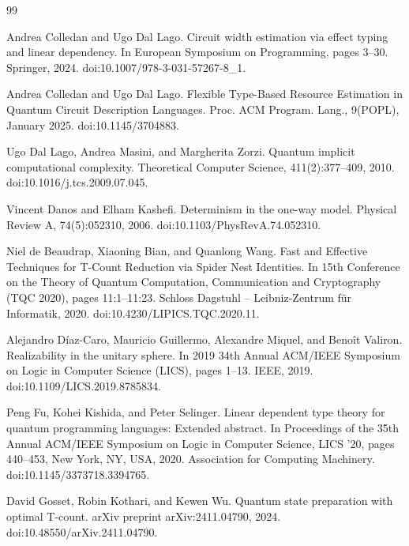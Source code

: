 \documentclass[10pt,a4paper]{amsart}
\begin{document}
\begin{thebibliography}{99}
\par\noindent  [9]  Andrea Colledan and Ugo Dal Lago.  Circuit width estimation via effect typing and linear dependency.  In European Symposium on Programming, pages 3–30. Springer, 2024.  doi:10.1007/978-3-031-57267-8\_1.  
 
\par\noindent  [10]  Andrea Colledan and Ugo Dal Lago.  Flexible Type-Based Resource Estimation in Quantum Circuit Description Languages.  Proc. ACM Program. Lang., 9(POPL), January 2025.  doi:10.1145/3704883.  
 
\par\noindent  [11]  Ugo Dal Lago, Andrea Masini, and Margherita Zorzi.  Quantum implicit computational complexity.  Theoretical Computer Science, 411(2):377–409, 2010.  doi:10.1016/j.tcs.2009.07.045.  
 
\par\noindent  [12]  Vincent Danos and Elham Kashefi.  Determinism in the one-way model.  Physical Review A, 74(5):052310, 2006.  doi:10.1103/PhysRevA.74.052310.  
 
\par\noindent  [13]  Niel de Beaudrap, Xiaoning Bian, and Quanlong Wang.  Fast and Effective Techniques for T-Count Reduction via Spider Nest Identities.  In 15th Conference on the Theory of Quantum Computation, Communication and Cryptography (TQC 2020), pages 11:1–11:23. Schloss Dagstuhl – Leibniz-Zentrum für Informatik, 2020.  doi:10.4230/LIPICS.TQC.2020.11.  
 
\par\noindent  [14]  Alejandro Díaz-Caro, Mauricio Guillermo, Alexandre Miquel, and Benoît Valiron.  Realizability in the unitary sphere.  In 2019 34th Annual ACM/IEEE Symposium on Logic in Computer Science (LICS), pages 1–13. IEEE, 2019.  doi:10.1109/LICS.2019.8785834.  
 
\par\noindent  [15]  Peng Fu, Kohei Kishida, and Peter Selinger.  Linear dependent type theory for quantum programming languages: Extended abstract.  In Proceedings of the 35th Annual ACM/IEEE Symposium on Logic in Computer Science, LICS ’20, pages 440–453, New York, NY, USA, 2020. Association for Computing Machinery.  doi:10.1145/3373718.3394765.  
 
\par\noindent  [16]  David Gosset, Robin Kothari, and Kewen Wu.  Quantum state preparation with optimal T-count.  arXiv preprint arXiv:2411.04790, 2024.  doi:10.48550/arXiv.2411.04790.  
 

\end{thebibliography}
\end{document}
